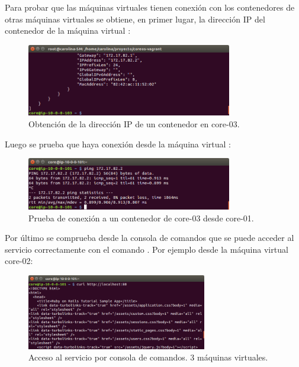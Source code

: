 Para probar que las máquinas virtuales tienen conexión con los contenedores de otras máquinas virtuales se obtiene, en primer lugar, la dirección IP del contenedor  de la máquina virtual :


\begin{figure}[H]
\centering
\includegraphics[width=0.8\textwidth]{images/figures/docker-inspect-3.png}
\caption{Obtención de la dirección IP de un contenedor en core-03.\label{fig:figure_placement_example}}
\end{figure}

Luego se prueba que haya conexión desde la máquina virtual :

\begin{figure}[H]
\centering
\includegraphics[width=0.8\textwidth]{images/figures/ping-1.png}
\caption{Prueba de conexión a un contenedor de core-03 desde core-01.\label{fig:figure_placement_example}}
\end{figure}

Por último se comprueba desde la consola de comandos que se puede acceder al servicio correctamente con el comando . Por ejemplo desde la máquina virtual core-02:

\begin{figure}[H]
\centering
\includegraphics[width=0.7\textwidth]{images/figures/curl-aws-3.png}
\caption{Acceso al servicio por consola de comandos. 3 máquinas virtuales.\label{fig:figure_placement_example}}
\end{figure}

